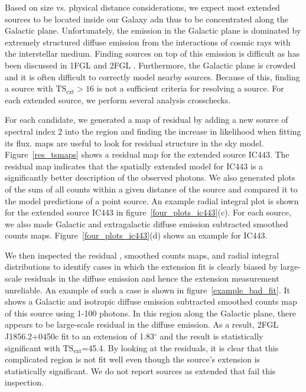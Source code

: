 \documentclass[12pt,preprint]{aastex}
\newcommand{\gev}{\text{GeV}\xspace}
\newcommand{\tsext}{{\ensuremath{\text{TS}_{\text{ext}}}}\xspace}
\newcommand{\ts}{\text{TS}\xspace}
\renewcommand{\deg}{\ensuremath{^\circ}\xspace}
\begin{document}
Based on size vs. physical distance considerations,
we expect most extended sources to be located inside our Galaxy
adn thus to be concentrated along the Galactic plane.  Unfortunately, the \gev emission
in the Galactic plane is dominated by extremely structured 
diffuse emission from the interactions of cosmic rays with the
interstellar medium.  Finding sources on top of this emission is difficult
\citep{first_diffuse_paper} as has been discussed in 1FGL and 2FGL
\citep{first_cat,second_cat}.  Furthermore, the Galactic plane is crowded
and it is often difficult to correctly model nearby sources.  Because of this,
finding a source with $\tsext>16$ is not a sufficient
criteria for resolving a source. For each extended source,
we perform several analysis crosschecks.

For each candidate, we generated a map of residual \ts by adding a new
source of spectral index 2 into the region and finding the increase in
likelihood when fitting its flux. \ts maps are useful to look for residual
structure in the sky model.  Figure~\ref{res_tsmaps} shows a residual \ts
map for the extended source IC443.  The residual \ts map indicates that
the spatially extended model for IC443 is a significantly better description
of the observed photons.
We also generated plots of the sum of
all counts within a given distance of the source and compared it to the
model predictions of a point source.  
An example radial integral plot is shown for the extended source IC443
in figure~\ref{four_plots_ic443}(c).  For each source, we also made
Galactic and extragalactic diffuse emission subtracted smoothed counts
maps. Figure~\ref{four_plots_ic443}(d) shows an example for IC443.

We then inspected the residual \ts, smoothed counts maps, and radial
integral distributions to identify cases in which the extension fit
is clearly biased by large-scale residuals in the diffuse emission
and hence the extension measurement unreliable.  An example of such a
case is shown in figure~\ref{example_bad_fit}. It shows a Galactic and
isotropic diffuse emission subtracted smoothed counts map of this source
using 1-100 \gev photons.  In this region along the Galactic plane,
there appears to be large-scale residual in the diffuse emission. As
a result, 2FGL\,J1856.2+0450c fit to an extension of 1.83\deg and the
result is statistically significant with \tsext=45.4.  By looking at
the residuals, it is clear that this complicated region is not fit well
even though the source's extension is statistically significant. We do
not report sources as extended that fail this inspection.
\end{document}

